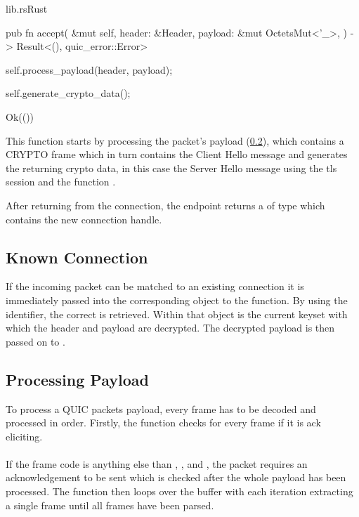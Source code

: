 \begin{codeblock}{lib.rs}{Rust}
    \begin{rustcode}
        pub fn accept(
            &mut self,
            header: &Header,
            payload: &mut OctetsMut<'_>,
        ) -> Result<(), quic_error::Error> {
            self.process_payload(header, payload);

            self.generate_crypto_data();

            Ok(())
        }
    \end{rustcode}
\end{codeblock}

This function starts by processing the packet's payload (\ref{process_payload}), which contains a CRYPTO frame which in turn
contains the Client Hello message and generates the returning crypto data, in this case the Server Hello message using
the tls session and the function .

After returning from the connection, the endpoint returns a  of type  which
contains the new connection handle.

\subsection{Known Connection} \label{known_conn}

If the incoming packet can be matched to an existing connection it is immediately passed into the corresponding object to
the  function. By using the  identifier, the correct 
is retrieved. Within that object is the current keyset with which the header and payload are decrypted. The decrypted payload
is then passed on to .

\subsection{Processing Payload} \label{process_payload}

To process a QUIC packets payload, every frame has to be decoded and processed in order. Firstly, the function checks for
every frame if it is ack eliciting. \\
 \\
If the frame code is anything else than , , and ,
the packet requires an acknowledgement to be sent which is checked after the whole payload has been processed. The function
then loops over the buffer with each iteration extracting a single frame until all frames have been parsed.

